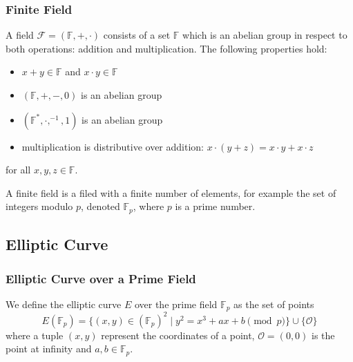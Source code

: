 \subsubsection{Finite Field}
A field \( \mathcal{F} = (\mathbb{F}, +, \cdot) \) consists of a set $\mathbb{F}$ which is an abelian group in respect to both operations: addition and multiplication. The following properties hold:
\begin{itemize}
    \item \( x + y \in \mathbb{F} \) and \( x \cdot y \in \mathbb{F} \)
    \item \( (\mathbb{F}, +, -, 0) \) is an abelian group
    \item \( (\mathbb{F}^*, \cdot, ^{-1}, 1) \) is an abelian group
    \item multiplication is distributive over addition: \( x \cdot (y + z) = x \cdot y + x \cdot z \)
\end{itemize}
for all \( x, y, z \in \mathbb{F} \).

A finite field is a filed with a finite number of elements, for example the set of integers modulo $p$, denoted $\mathbb{F}_p$, where $p$ is a prime number.



\subsection{Elliptic Curve}

\subsubsection{Elliptic Curve over a Prime Field}
We define the elliptic curve $E$ over the prime field $\mathbb{F}_p$ as the set of points
\[
    E(\mathbb{F}_p) = \{(x, y) \in (\mathbb{F}_p)^2 \mid y^2 = x^3 + ax + b \pmod p \} \cup \{ \mathcal{O} \}
\]
where a tuple \( (x, y) \) represent the coordinates of a point, \( \mathcal{O} = (0, 0) \) is the point at infinity and \( a, b \in \mathbb{F}_p \).


